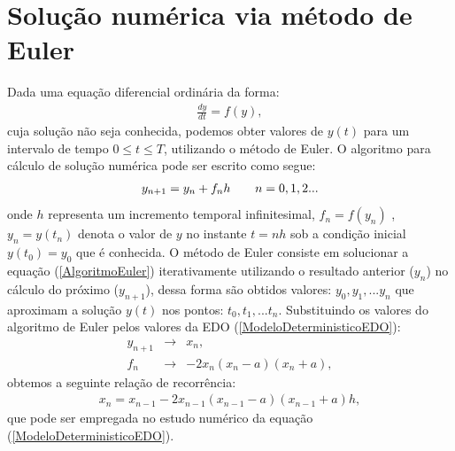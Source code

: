 \section{Solução numérica via método de Euler}
Dada uma equação diferencial ordinária da forma:
\begin{eqnarray}\label{FormaEDO}
\frac{dy}{dt} = f(y),
\end{eqnarray}
cuja solução não seja conhecida, podemos obter valores de $y(t)$ para um intervalo de tempo  $0 \leq t \leq T $, utilizando o método de Euler. O algoritmo para cálculo de solução numérica pode ser escrito como segue:
\begin{eqnarray}\label{AlgoritmoEuler}
y_{n+1} = y_{n} + f_{n} h \hspace{0.7cm} n = 0,1,2...
\end{eqnarray} 
onde $h$ representa um incremento temporal infinitesimal, $f_{n} = f(y_{n})$ , $y_{n} = y(t_{n})$ denota o valor de $y$ no instante $t = nh$ sob a condição inicial $y(t_{0}) = y_{0}$ que é conhecida. O método de Euler consiste em solucionar a equação (\ref{AlgoritmoEuler}) iterativamente utilizando o resultado anterior ($y_{n}$) no cálculo do próximo ($y_{n+1}$), dessa forma são obtidos valores: $y_{0}, y_{1},... y_{n}$ que aproximam a solução $y(t)$ nos pontos: $t_{0}, t_{1}, ... t_{n}$. Substituindo os valores do algoritmo de Euler pelos valores da EDO (\ref{ModeloDeterministicoEDO}):
\begin{eqnarray}
y_{n+1} &\rightarrow & x_{n},    \\
f_{n} &\rightarrow & -2x_{n}(x_{n}-a)(x_{n}+a), 
\end{eqnarray}
obtemos a seguinte relação de recorrência:
\begin{eqnarray}\label{AplicacaoEuler}
x_n = x_{n-1} - 2x_{n-1}(x_{n-1} - a)(x_{n-1} + a)h ,
\end{eqnarray}
que pode ser empregada no estudo numérico da equação (\ref{ModeloDeterministicoEDO}).